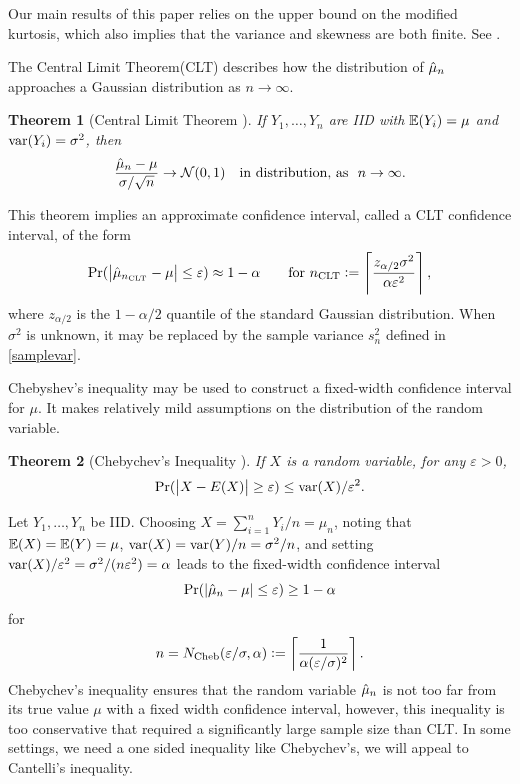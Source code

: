 \documentclass{iitthesis}
\newtheorem{theorem}{Theorem}[section]
\begin{document}
Our main results of this paper relies on the upper bound on the modified kurtosis, which also implies that the variance and skewness are both finite. See \cite{HJLO12}.

The Central Limit Theorem(CLT) describes how the distribution of $\hat{\mu}_n$ approaches a Gaussian distribution as $n \to \infty$.
\begin{theorem}[Central Limit Theorem {\cite[Theorem 21.1]{JP04}}] \label{clt} 
If $Y_1, \ldots, Y_n$ are IID with $\mathbb{E}(Y_i)=\mu$ and $\operatorname{var}(Y_i) = \sigma^2$, then
$$
\frac{\hmu_n-\mu}{\sigma/\sqrt{n}} \to \dnorm(0,1) \quad \text{in distribution, as} \ \ n\to\infty.
$$
\end{theorem}
This theorem implies an approximate confidence interval, called a CLT confidence interval, of the form
\[
\Pr(\left \lvert \hat{\mu}_{n_{\text{CLT}}}-\mu \right \rvert \le \varepsilon) \approx 1- \alpha \qquad \text{for } n_{\text{CLT}} := \left \lceil \frac{z_{\alpha/2}\sigma^2}{\alpha \varepsilon^2} \right \rceil,
\]
where $z_{\alpha/2}$ is the $1-\alpha/2$ quantile of the standard Gaussian distribution.  When $\sigma^2$ is unknown, it may be replaced by the sample variance $s_n^2$ defined in \eqref{samplevar}.

Chebyshev's inequality may be used to construct a fixed-width confidence interval for $\mu$.  It makes relatively mild assumptions on the distribution of the random variable.

\begin{theorem}[Chebychev's Inequality {\cite[6.1.c]{LB10}}] \label{ChebyThm}
If $X$ is a random variable, for any $\varepsilon>0$, 
$$\Pr(\left \lvert X-E(X) \right \rvert \ge \varepsilon) \le  \operatorname{var}(X)/\varepsilon^2.$$
\end{theorem}
Let $Y_1, \ldots, Y_n$ be IID. Choosing $X=\sum_{i=1}^n Y_i/n = \mu_n$, noting that $\mathbb{E}(X) = \mathbb{E}(Y) = \mu$, $\operatorname{var}(X) = \operatorname{var}(Y)/n = \sigma^2/n$, and setting $\operatorname{var}(X)/\varepsilon^2=\sigma^2/(n\varepsilon^2) = \alpha$ leads to the fixed-width confidence interval 
\[
\Pr(\left \lvert \hat{\mu}_{n}-\mu \right \rvert \le \varepsilon) \ge 1- \alpha 
\]
 for 
 \begin{align}
n=N_{\text{Cheb}}(\varepsilon/\sigma,\alpha):= \left \lceil \frac{1}{\alpha (\varepsilon/\sigma)^2} \right \rceil.
 \end{align}
 Chebychev's inequality ensures that the random variable $\hat{\mu}_n$ is not too far from its true value $\mu$ with a fixed width confidence interval, however, this inequality is too conservative that required a significantly large sample size than CLT. In some settings, we need a one sided inequality like Chebychev's, we will appeal to Cantelli's inequality.
 
\end{document}
